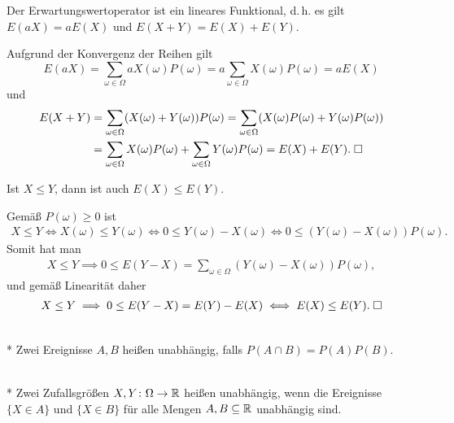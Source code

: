 \newpage
\begin{Korollar} Der Erwartungswertoperator ist ein lineares Funktional,
d.\,h. es gilt $E(aX)=aE(X)$ und $E(X+Y)=E(X)+E(Y)$. 
\end{Korollar}
 Aufgrund der Konvergenz der Reihen gilt
\[E(aX) = \sum_{\omega\in\Omega}aX(\omega)P(\omega)
= a\sum_{\omega\in\Omega}X(\omega)P(\omega) = aE(X)\]
und
\begin{align*}
E(X+Y) &= \sum_{\omega\in\Omega} (X(\omega)+Y(\omega))P(\omega)
= \sum_{\omega\in\Omega} (X(\omega)P(\omega)+Y(\omega)P(\omega))\\
&= \sum_{\omega\in\Omega} X(\omega)P(\omega)
+ \sum_{\omega\in\Omega} Y(\omega)P(\omega) = E(X)+E(Y).\;\square
\end{align*}

\begin{Korollar} Ist $X\le Y$, dann ist auch $E(X)\le E(Y)$.
\end{Korollar}
 Gemäß $P(\omega)\ge 0$ ist
\begin{gather*}
X\le Y\iff X(\omega)\le Y(\omega)\iff 0\le Y(\omega)-X(\omega)
\iff 0\le (Y(\omega)-X(\omega))P(\omega).
\end{gather*}
Somit hat man
\begin{gather*}
X\le Y\implies 0\le E(Y-X) = \sum_{\omega\in\Omega} (Y(\omega)-X(\omega))P(\omega),
\end{gather*}
und gemäß Linearität daher
\begin{gather*}
X\le Y\implies 0\le E(Y-X) = E(Y)-E(X) \iff E(X)\le E(Y).\;\square
\end{gather*}

\begin{Definition}\mbox{}\\*
Zwei Ereignisse $A,B$ heißen unabhängig, falls $P(A\cap B)=P(A)P(B)$.
\end{Definition}

\begin{Definition}\mbox{}\\*
Zwei Zufallsgrößen $X,Y\colon\Omega\to\mathbb R$ heißen unabhängig, wenn
die Ereignisse $\{X\in A\}$ und $\{X\in B\}$
für alle Mengen $A,B\subseteq\mathbb R$ unabhängig sind.
\end{Definition}

